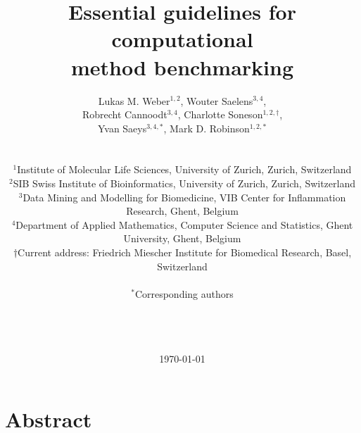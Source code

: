 \documentclass[12pt, a4paper]{article}
\begin{document}

\title{\Large{\textbf{
Essential guidelines for computational \\method benchmarking
}}{\vskip 1cm}}

\author{
Lukas M. Weber$^{1,2}$,
Wouter Saelens$^{3,4}$,\\
Robrecht Cannoodt$^{3,4}$,
Charlotte Soneson$^{1,2,\dagger}$,\\
Yvan Saeys$^{3,4,*}$,
Mark D. Robinson$^{1,2,*}$\\ \\ \\
\footnotesize{$^1$Institute of Molecular Life Sciences, University of Zurich, Zurich, Switzerland}\\
\footnotesize{$^2$SIB Swiss Institute of Bioinformatics, University of Zurich, Zurich, Switzerland}\\
\footnotesize{$^3$Data Mining and Modelling for Biomedicine, VIB Center for Inflammation Research, Ghent, Belgium}\\
\footnotesize{$^4$Department of Applied Mathematics, Computer Science and Statistics, Ghent University, Ghent, Belgium}\\
\footnotesize{$\dagger$Current address: Friedrich Miescher Institute for Biomedical Research, Basel, Switzerland}\\ \\
\small{$^*$Corresponding authors}\\ \\ \\ \\
}

\date{\today}



\begin{titlepage}

\maketitle

\thispagestyle{empty}

\end{titlepage}




\section*{Abstract}
\end{document}
